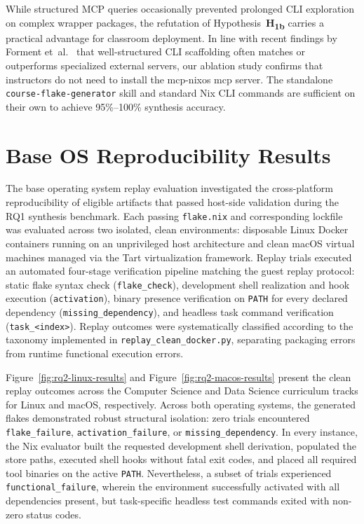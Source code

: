 While structured MCP queries occasionally prevented prolonged CLI exploration on complex
wrapper packages, the refutation of Hypothesis~\textbf{H\textsubscript{1b}}
carries a practical advantage for classroom deployment. In line with recent findings
by Forment et~al.~\cite{formentScaffoldingMattersMore2026} that well-structured
CLI scaffolding often matches or outperforms specialized external servers, our
ablation study confirms that instructors do not need to install the mcp-nixos mcp server.
The standalone \texttt{course-flake-generator} skill and standard
Nix CLI commands are sufficient on their own to achieve 95\%--100\% synthesis
accuracy.
\section{Base OS Reproducibility Results}
\label{sec:base-os-results}

The base operating system replay evaluation investigated the cross-platform
reproducibility of eligible artifacts that passed host-side validation during
the RQ1 synthesis benchmark. Each passing \texttt{flake.nix} and corresponding
lockfile was evaluated across two isolated, clean environments: disposable Linux
Docker containers running on an unprivileged host architecture and clean macOS
virtual machines managed via the Tart virtualization framework. Replay trials executed
an automated four-stage verification pipeline matching the guest replay protocol:
static flake syntax check (\texttt{flake\_check}), development shell realization
and hook execution (\texttt{activation}), binary presence verification on
\texttt{PATH} for every declared dependency (\texttt{missing\_dependency}), and headless
task command verification (\texttt{task\_<index>}). Replay outcomes were systematically
classified according to the taxonomy implemented in \texttt{replay\_clean\_docker.py},
separating packaging errors from runtime functional execution errors.

Figure~\ref{fig:rq2-linux-results} and Figure~\ref{fig:rq2-macos-results} present
the clean replay outcomes across the Computer Science and Data Science curriculum
tracks for Linux and macOS, respectively. Across both operating systems, the
generated flakes demonstrated robust structural isolation: zero trials encountered
\texttt{flake\_failure}, \texttt{activation\_failure}, or \texttt{missing\_dependency}.
In every instance, the Nix evaluator built the requested development shell
derivation, populated the store paths, executed shell hooks without fatal exit
codes, and placed all required tool binaries on the active \texttt{PATH}. Nevertheless,
a subset of trials experienced \texttt{functional\_failure}, wherein the
environment successfully activated with all dependencies present, but task-specific
headless test commands exited with non-zero status codes.

